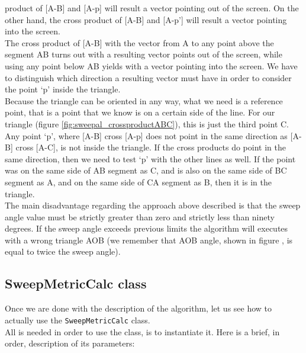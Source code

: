 product of [A-B] and [A-p] will result a vector
pointing out of the screen. On the other hand, the cross product
of [A-B] and [A-p'] will result a vector pointing
into the screen.
\\
The cross product of [A-B] with the vector from A to any point above
the segment AB turns out with a resulting vector
points out of the screen, while using any point below AB yields
with a vector pointing into the screen. We have to
distinguish which direction a resulting vector must have in order to
consider the point `p' inside the triangle.
\\
Because the triangle can be oriented in any way, what we need is a
reference point, that is a point that we know is
on a certain side of the line. For our triangle (figure
\ref{fig:sweepal_crossproductABC}), this is just the third
point C.
\\
Any point `p', where [A-B] cross [A-p] does not point in the same
direction as [A-B] cross [A-C], is not inside the
triangle. If the cross products do point in the same direction, then
we need to test `p' with the other lines as well.
If the point was on the same side of AB segment as C, and is also on the
same side of BC segment as A, and on the same
side of CA segment as B, then it is in the triangle.
\\
The main disadvantage regarding the approach above described is that the
sweep angle value must be strictly greater
than zero and strictly less than ninety degrees. If the sweep angle exceeds
previous limits the algorithm will executes
with a wrong triangle AOB (we remember that AOB angle, shown in figure
, is equal to twice
the sweep angle).


\subsection{SweepMetricCalc class}
\label{concr:iimageselector:sweep_metric_class}

Once we are done with the description of the algorithm, 
let us see how to actually use the \texttt{SweepMetricCalc} 
class.
\\
All is needed in order to use the class, is to instantiate it.
Here is a brief, in order, description of its parameters:

